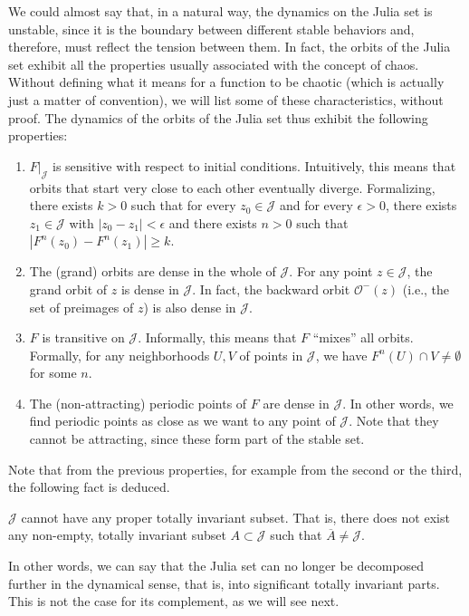 \documentclass[12pt, a4paper]{article}
\begin{document}
We could almost say that, in a natural way, the dynamics on the Julia set is
unstable, since it is the boundary between different stable behaviors and,
therefore, must reflect the tension between them. In fact, the orbits of the
Julia set exhibit all the properties usually associated with the concept of
chaos. Without defining what it means for a function to be chaotic (which is
actually just a matter of convention), we will list some of these
characteristics, without proof. The dynamics of the orbits of the Julia set thus
exhibit the following properties:
\begin{enumerate}
    \item $F|_{\mathcal{J}}$ is sensitive with respect to initial conditions.
    Intuitively, this means that orbits that start very close to each other
    eventually diverge. Formalizing, there exists $k>0$ such that for every
    $z_{0}\in\mathcal{J}$ and for every $\epsilon>0$, there exists
    $z_{1}\in\mathcal{J}$ with $|z_{0}-z_{1}|<\epsilon$ and there exists $n>0$
    such that $|F^{n}(z_{0})-F^{n}(z_{1})|\ge k$.
    \item The (grand) orbits are dense in the whole of $\mathcal{J}$. For any
    point $z\in\mathcal{J}$, the grand orbit of $z$ is dense in $\mathcal{J}$.
    In fact, the backward orbit $\mathcal{O}^{-}(z)$ (i.e., the set of preimages
    of $z$) is also dense in $\mathcal{J}$.
    \item $F$ is transitive on $\mathcal{J}$. Informally, this means that $F$
    ``mixes'' all orbits. Formally, for any neighborhoods $U, V$ of points in
    $\mathcal{J}$, we have $F^{n}(U)\cap V\neq\emptyset$ for some $n$.
    \item The (non-attracting) periodic points of $F$ are dense in
    $\mathcal{J}$. In other words, we find periodic points as close as we want
    to any point of $\mathcal{J}$. Note that they cannot be attracting, since
    these form part of the stable set.
\end{enumerate}

Note that from the previous properties, for example from the second or the
third, the following fact is deduced.

\begin{proposition}
$\mathcal{J}$ cannot have any proper totally invariant subset. That is, there
does not exist any non-empty, totally invariant subset $A\subset\mathcal{J}$
such that $\overline{A}\neq\mathcal{J}$.
\end{proposition}

In other words, we can say that the Julia set can no longer be decomposed
further in the dynamical sense, that is, into significant totally invariant
parts. This is not the case for its complement, as we will see next.
\end{document}
